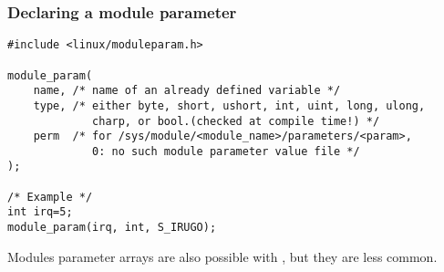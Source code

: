 \begin{frame}[fragile]
  \frametitle{Declaring a module parameter}

\begin{verbatim}
#include <linux/moduleparam.h>

module_param(
    name, /* name of an already defined variable */
    type, /* either byte, short, ushort, int, uint, long, ulong,
             charp, or bool.(checked at compile time!) */ 
    perm  /* for /sys/module/<module_name>/parameters/<param>,
             0: no such module parameter value file */
);

/* Example */
int irq=5;
module_param(irq, int, S_IRUGO);
\end{verbatim}
Modules parameter arrays are also possible with
, but they are less common.
\end{frame}
